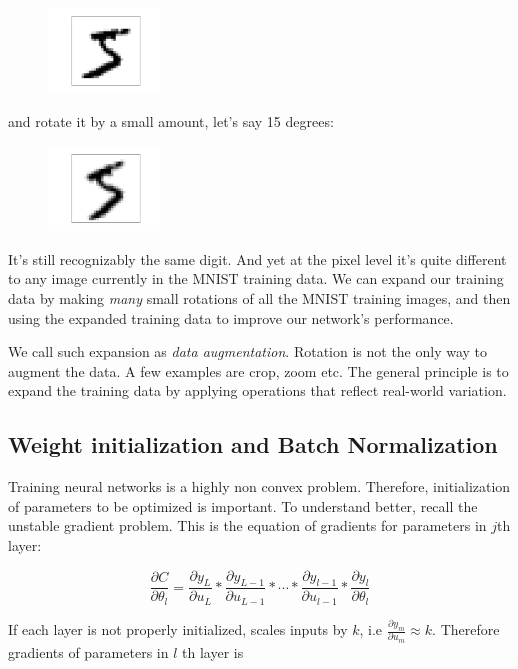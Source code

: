 \documentclass[a4paper]{tufte-handout}
\begin{document}
\begin{figure}
  \includegraphics[width=30mm]{more_data_5.png}
\end{figure}

and rotate it by a small amount, let's say 15 degrees:

\begin{figure}
  \includegraphics[width=30mm]{more_data_rotated_5.png}
\end{figure}


It's still recognizably the same digit. And yet at the pixel level it's
quite different to any image currently in the MNIST training data. We
can expand our training data by making \emph{many} small rotations of
all the MNIST training images, and then using the expanded training data
to improve our network's performance.

We call such expansion as \emph{data augmentation}. Rotation is not the
only way to augment the data. A few examples are crop, zoom etc. The
general principle is to expand the training data by applying operations
that reflect real-world variation.

\subsection{Weight initialization and Batch
Normalization}\label{weight-initialization-and-batch-normalization}

Training neural networks is a highly non convex problem. Therefore,
initialization of parameters to be optimized is important. To understand
better, recall the unstable gradient problem. This is the equation of
gradients for parameters in \(j\)th layer:

\[\frac{\partial C}{\partial \theta_l} = \frac{\partial y_L}{\partial u_L} * \frac{\partial y_{L-1}}{\partial u_{L-1}} * \cdots * \frac{\partial y_{l-1}}{\partial u_{l-1}} * \frac{\partial y_l}{\partial \theta_l}\]

If each layer is not properly initialized, scales inputs by \(k\), i.e
\(\frac{\partial y_m}{\partial u_m} \approx k\). Therefore gradients of
parameters in \(l\) th layer is
\end{document}

